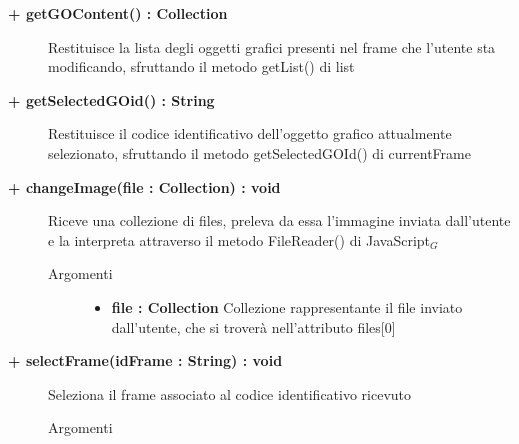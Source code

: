 \begin{description}
	\begin{description}
		\item[\textbf{\color{blue}+ getGOContent() : Collection	}] \hfill
			Restituisce la lista degli oggetti grafici presenti nel frame che l'utente sta modificando, sfruttando il metodo getList() di list
		
	\end{description}
	
	\begin{description}
		\item[\textbf{\color{blue}+ getSelectedGOid() : String	}] \hfill
			Restituisce il codice identificativo dell'oggetto grafico attualmente selezionato, sfruttando il metodo getSelectedGOId() di currentFrame
		
	\end{description}
	
	\begin{description}
		\item[\textbf{\color{blue}+ changeImage(file : Collection) : void  	}] \hfill
			Riceve una collezione di files, preleva da essa l'immagine inviata dall'utente e la interpreta attraverso il metodo FileReader() di JavaScript$_G$
			
		\begin{description}
			\item[Argomenti] \hfill
				\begin{itemize}
				
					\item \textbf{file : Collection		} \hfill
					Collezione rappresentante il file inviato dall'utente, che si troverà nell'attributo files[0]					
				\end{itemize}
				
		\end{description}
	\end{description}
	
	\begin{description}
		\item[\textbf{\color{blue}+ selectFrame(idFrame : String) : void  	}] \hfill
			Seleziona il frame associato al codice identificativo ricevuto
			
		\begin{description}
			\item[Argomenti] \hfill
				\begin{itemize}
				

\end{itemize}
\end{description}
\end{description}
\end{description}
